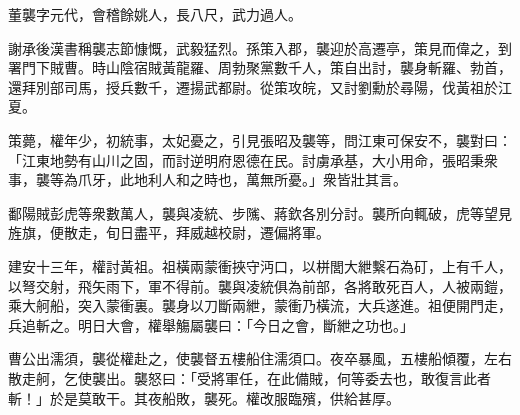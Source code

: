 
\begin{pinyinscope}
董襲字元代，會稽餘姚人，長八尺，武力過人。

謝承後漢書稱襲志節慷慨，武毅猛烈。孫策入郡，襲迎於高遷亭，策見而偉之，到署門下賊曹。時山陰宿賊黃龍羅、周勃聚黨數千人，策自出討，襲身斬羅、勃首，還拜別部司馬，授兵數千，遷揚武都尉。從策攻皖，又討劉勳於尋陽，伐黃祖於江夏。

策薨，權年少，初統事，太妃憂之，引見張昭及襲等，問江東可保安不，襲對曰：「江東地勢有山川之固，而討逆明府恩德在民。討虜承基，大小用命，張昭秉衆事，襲等為爪牙，此地利人和之時也，萬無所憂。」衆皆壯其言。

鄱陽賊彭虎等衆數萬人，襲與凌統、步隲、蔣欽各別分討。襲所向輒破，虎等望見旌旗，便散走，旬日盡平，拜威越校尉，遷偏將軍。

建安十三年，權討黃祖。祖橫兩蒙衝挾守沔口，以栟閭大紲繫石為矴，上有千人，以弩交射，飛矢雨下，軍不得前。襲與凌統俱為前部，各將敢死百人，人被兩鎧，乘大舸船，突入蒙衝裏。襲身以刀斷兩紲，蒙衝乃橫流，大兵遂進。祖便開門走，兵追斬之。明日大會，權舉觴屬襲曰：「今日之會，斷紲之功也。」

曹公出濡須，襲從權赴之，使襲督五樓船住濡須口。夜卒暴風，五樓船傾覆，左右散走舸，乞使襲出。襲怒曰：「受將軍任，在此備賊，何等委去也，敢復言此者斬！」於是莫敢干。其夜船敗，襲死。權改服臨殯，供給甚厚。


\end{pinyinscope}
